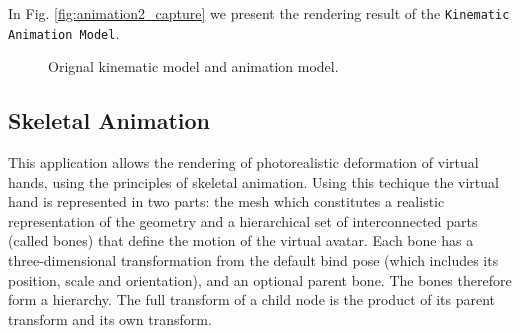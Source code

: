 In Fig. \ref{fig:animation2_capture} we present the rendering result of 
the \texttt{Kinematic Animation Model}.
\begin{figure}[h]
    \centering
    \qquad
    \caption{Orignal kinematic model and animation model.}
    \label{fig:model_comparison_kinematic_animation}
\end{figure}
\subsection{Skeletal Animation}
This application allows the rendering 
of photorealistic deformation of virtual hands, using the
principles of skeletal animation. Using this techique the virtual hand is 
represented in two parts: the mesh which constitutes a realistic 
representation of the geometry and a hierarchical set of interconnected parts
(called bones) that define the motion of the virtual avatar.
Each bone has a three-dimensional transformation from the default bind
pose (which includes its position, scale and orientation), and an optional
parent bone. The bones therefore form a hierarchy. The full transform of a
child node is the product of its parent transform and its own transform.

